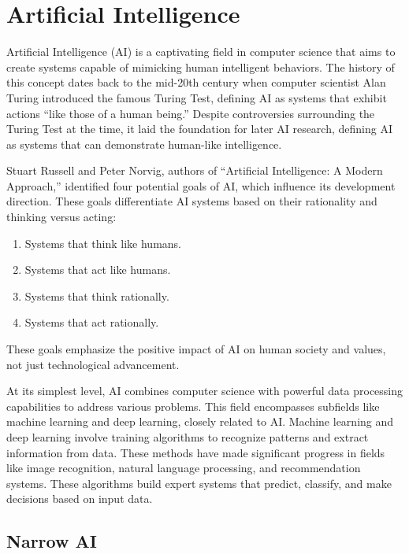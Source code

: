 \documentclass[
]{book}
\providecommand{\tightlist}{%
  \setlength{\itemsep}{0pt}\setlength{\parskip}{0pt}}
\begin{document}
\hypertarget{artificial-intelligence}{%
\section{Artificial Intelligence}\label{artificial-intelligence}}

Artificial Intelligence (AI) is a captivating field in computer science that aims to create systems capable of mimicking human intelligent behaviors. The history of this concept dates back to the mid-20th century when computer scientist Alan Turing introduced the famous Turing Test, defining AI as systems that exhibit actions ``like those of a human being.'' Despite controversies surrounding the Turing Test at the time, it laid the foundation for later AI research, defining AI as systems that can demonstrate human-like intelligence.

Stuart Russell and Peter Norvig, authors of ``Artificial Intelligence: A Modern Approach,'' identified four potential goals of AI, which influence its development direction. These goals differentiate AI systems based on their rationality and thinking versus acting:

\begin{enumerate}
\def\labelenumi{\arabic{enumi}.}
\tightlist
\item
  Systems that think like humans.
\item
  Systems that act like humans.
\item
  Systems that think rationally.
\item
  Systems that act rationally.
\end{enumerate}

These goals emphasize the positive impact of AI on human society and values, not just technological advancement.

At its simplest level, AI combines computer science with powerful data processing capabilities to address various problems. This field encompasses subfields like machine learning and deep learning, closely related to AI. Machine learning and deep learning involve training algorithms to recognize patterns and extract information from data. These methods have made significant progress in fields like image recognition, natural language processing, and recommendation systems. These algorithms build expert systems that predict, classify, and make decisions based on input data.

\hypertarget{narrow-ai}{%
\subsection{Narrow AI}\label{narrow-ai}}
\end{document}
